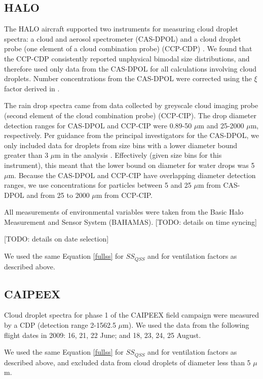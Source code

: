 \documentclass{article}
\begin{document}
\clearpage
\newpage

\subsection{HALO}

The HALO aircraft supported two instruments for measuring cloud droplet spectra: a cloud and aerosol spectrometer (CAS-DPOL) and a cloud droplet probe (one element of a cloud combination probe) (CCP-CDP) \cite{Braga2017}. We found that the CCP-CDP consistently reported unphysical bimodal size distributions, and therefore used only data from the CAS-DPOL for all calculations involving cloud droplets. Number concentrations from the CAS-DPOL were corrected using the $\xi$ factor derived in \cite{Weigel2016}.

The rain drop spectra came from data collected by greyscale cloud imaging probe (second element of the cloud combination probe) (CCP-CIP). The drop diameter detection ranges for CAS-DPOL and CCP-CIP were 0.89-50 $\mu$m and 25-2000 $\mu$m, respectively. Per guidance from the principal investigators for the CAS-DPOL, we only included data for droplets from size bins with a lower diameter bound greater than 3 $\mu$m in the analysis \cite{Jurkat2020}. Effectively (given size bins for this instrument), this meant that the lower bound on diameter for water drops was 5 $\mu$m. Because the CAS-DPOL and CCP-CIP have overlapping diameter detection ranges, we use concentrations for particles between 5 and 25 $\mu$m from CAS-DPOL and from 25 to 2000 $\mu$m from CCP-CIP. 

All measurements of environmental variables were taken from the Basic Halo Measurement and Sensor System (BAHAMAS). [TODO: details on time syncing]

[TODO: details on date selection]

We used the same Equation \ref{fullss} for $SS_{QSS}$ and for ventilation factors as described above.

\subsection{CAIPEEX}

Cloud droplet spectra for phase 1 of the CAIPEEX field campaign were measured by a CDP (detection range 2-1562.5 $\mu$m). We used the data from the following flight dates in 2009: 16, 21, 22 June; and 18, 23, 24, 25 August.

We used the same Equation \ref{fullss} for $SS_{QSS}$ and for ventilation factors as described above, and excluded data from cloud droplets of diameter less than 5 $\mu$m.
\end{document}
